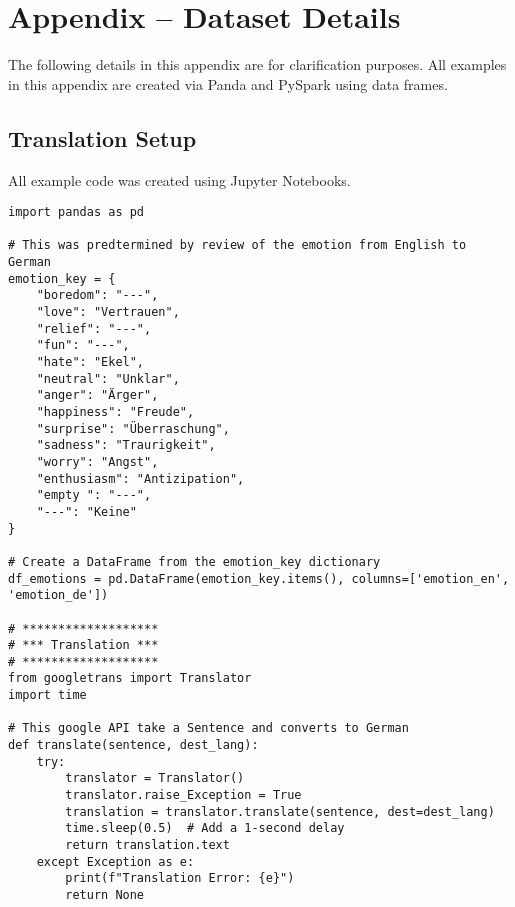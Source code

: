 \section{Appendix -- Dataset Details}
The following details in this appendix are for clarification purposes.
All examples in this appendix are created via Panda and PySpark using data frames.

\subsection{Translation Setup}
All example code was created using Jupyter Notebooks.
\begin{verbatim}
import pandas as pd

# This was predtermined by review of the emotion from English to German
emotion_key = {
    "boredom": "---",
    "love": "Vertrauen",
    "relief": "---",
    "fun": "---",
    "hate": "Ekel",
    "neutral": "Unklar",
    "anger": "Ärger",
    "happiness": "Freude",
    "surprise": "Überraschung",
    "sadness": "Traurigkeit",
    "worry": "Angst",
    "enthusiasm": "Antizipation",
    "empty ": "---",
    "---": "Keine"
}

# Create a DataFrame from the emotion_key dictionary
df_emotions = pd.DataFrame(emotion_key.items(), columns=['emotion_en', 'emotion_de'])

# *******************
# *** Translation ***
# *******************
from googletrans import Translator
import time

# This google API take a Sentence and converts to German
def translate(sentence, dest_lang):
    try:
        translator = Translator()
        translator.raise_Exception = True
        translation = translator.translate(sentence, dest=dest_lang)
        time.sleep(0.5)  # Add a 1-second delay
        return translation.text
    except Exception as e:
        print(f"Translation Error: {e}")
        return None
\end{verbatim}
\clearpage



